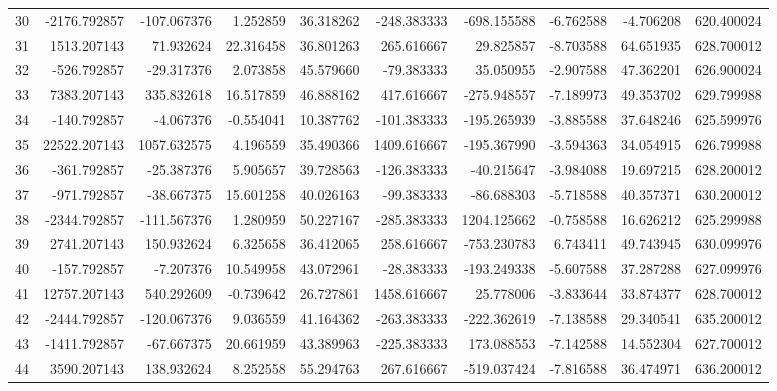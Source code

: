 \begin{tabular}{lrrrrrrrrr}
30  &  -2176.792857 &  -107.067376 &   1.252859 &  36.318262 &  -248.383333 &  -698.155588 &  -6.762588 &  -4.706208 &  620.400024 \\
31  &   1513.207143 &    71.932624 &  22.316458 &  36.801263 &   265.616667 &    29.825857 &  -8.703588 &  64.651935 &  628.700012 \\
32  &   -526.792857 &   -29.317376 &   2.073858 &  45.579660 &   -79.383333 &    35.050955 &  -2.907588 &  47.362201 &  626.900024 \\
33  &   7383.207143 &   335.832618 &  16.517859 &  46.888162 &   417.616667 &  -275.948557 &  -7.189973 &  49.353702 &  629.799988 \\
34  &   -140.792857 &    -4.067376 &  -0.554041 &  10.387762 &  -101.383333 &  -195.265939 &  -3.885588 &  37.648246 &  625.599976 \\
35  &  22522.207143 &  1057.632575 &   4.196559 &  35.490366 &  1409.616667 &  -195.367990 &  -3.594363 &  34.054915 &  626.799988 \\
36  &   -361.792857 &   -25.387376 &   5.905657 &  39.728563 &  -126.383333 &   -40.215647 &  -3.984088 &  19.697215 &  628.200012 \\
37  &   -971.792857 &   -38.667375 &  15.601258 &  40.026163 &   -99.383333 &   -86.688303 &  -5.718588 &  40.357371 &  630.200012 \\
38  &  -2344.792857 &  -111.567376 &   1.280959 &  50.227167 &  -285.383333 &  1204.125662 &  -0.758588 &  16.626212 &  625.299988 \\
39  &   2741.207143 &   150.932624 &   6.325658 &  36.412065 &   258.616667 &  -753.230783 &   6.743411 &  49.743945 &  630.099976 \\
40  &   -157.792857 &    -7.207376 &  10.549958 &  43.072961 &   -28.383333 &  -193.249338 &  -5.607588 &  37.287288 &  627.099976 \\
41  &  12757.207143 &   540.292609 &  -0.739642 &  26.727861 &  1458.616667 &    25.778006 &  -3.833644 &  33.874377 &  628.700012 \\
42  &  -2444.792857 &  -120.067376 &   9.036559 &  41.164362 &  -263.383333 &  -222.362619 &  -7.138588 &  29.340541 &  635.200012 \\
43  &  -1411.792857 &   -67.667375 &  20.661959 &  43.389963 &  -225.383333 &   173.088553 &  -7.142588 &  14.552304 &  627.700012 \\
44  &   3590.207143 &   138.932624 &   8.252558 &  55.294763 &   267.616667 &  -519.037424 &  -7.816588 &  36.474971 &  636.200012 \\

\end{tabular}
